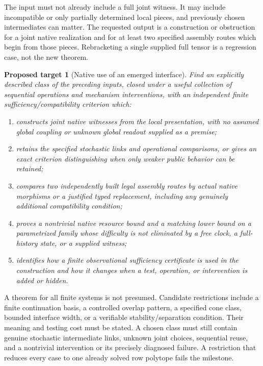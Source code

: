 \documentclass[11pt]{article}
\newtheorem{target}[definition]{Proposed target}
\theoremstyle{remark}
\begin{document}
The input must not already include a full joint witness. It may include incompatible or only partially determined local pieces, and previously chosen intermediates can matter. The requested output is a construction or obstruction for a joint native realization and for at least two specified assembly routes which begin from those pieces. Rebracketing a single supplied full tensor is a regression case, not the new theorem.

\begin{target}[Native use of an emerged interface]
\label{target:multistage}
Find an explicitly described class of the preceding inputs, closed under a useful collection of sequential operations and mechanism interventions, with an independent finite sufficiency/compatibility criterion which:
\begin{enumerate}
\item constructs joint native witnesses from the local presentation, with no assumed global coupling or unknown global readout supplied as a premise;
\item retains the specified stochastic links and operational comparisons, or gives an exact criterion distinguishing when only weaker public behavior can be retained;
\item compares two independently built legal assembly routes by actual native morphisms or a justified typed replacement, including any genuinely additional compatibility condition;
\item proves a nontrivial native resource bound and a matching lower bound on a parametrized family whose difficulty is not eliminated by a free clock, a full-history state, or a supplied witness;
\item identifies how a finite observational sufficiency certificate is used in the construction and how it changes when a test, operation, or intervention is added or hidden.
\end{enumerate}
\end{target}

A theorem for all finite systems is not presumed. Candidate restrictions include a finite continuation basis, a controlled overlap pattern, a specified cone class, bounded interface width, or a verifiable stability/separation condition. Their meaning and testing cost must be stated. A chosen class must still contain genuine stochastic intermediate links, unknown joint choices, sequential reuse, and a nontrivial intervention or its precisely diagnosed failure. A restriction that reduces every case to one already solved row polytope fails the milestone.
\end{document}
